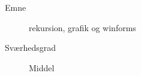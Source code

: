 \begin{description}
\item[Emne] rekursion, grafik og winforms
\item[Sværhedsgrad] Middel
\end{description}
